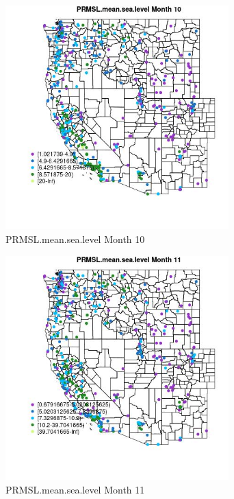 \begin{figure} 
\centering  
\includegraphics[width=0.77\textwidth]{Code_Outputs/ML_input_report_ML_input_PM25_Step5_part_d_de_duplicated_aves_ML_input_MapObsMo10PRMSLmeansealevel.jpg} 
\caption{\label{fig:ML_input_report_ML_input_PM25_Step5_part_d_de_duplicated_aves_ML_inputMapObsMo10PRMSLmeansealevel}PRMSL.mean.sea.level Month 10} 
\end{figure} 
 

\begin{figure} 
\centering  
\includegraphics[width=0.77\textwidth]{Code_Outputs/ML_input_report_ML_input_PM25_Step5_part_d_de_duplicated_aves_ML_input_MapObsMo11PRMSLmeansealevel.jpg} 
\caption{\label{fig:ML_input_report_ML_input_PM25_Step5_part_d_de_duplicated_aves_ML_inputMapObsMo11PRMSLmeansealevel}PRMSL.mean.sea.level Month 11} 
\end{figure} 
 

